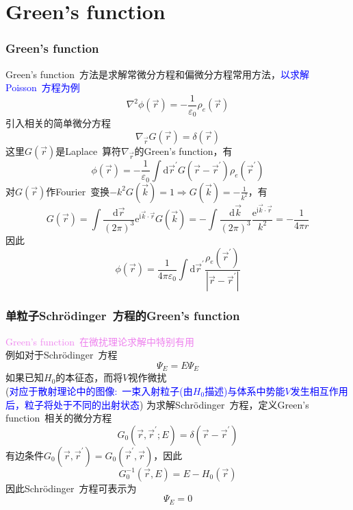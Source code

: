 \documentclass[cjk,slidestop,compress,mathserif,blue]{beamer}
\begin{document}
\section{\rm{Green's function}}
\frame
{
	\frametitle{\textrm{Green's function}}
	\textrm{Green's function~}方法是求解常微分方程和偏微分方程常用方法，\textcolor{blue}{以求解\textrm{Poisson~}方程为例}
		\vskip -10pt		
		\begin{displaymath}
			\nabla^2\phi(\vec r)=-\frac1{\varepsilon_0}\rho_e(\vec r)
		\end{displaymath}
		引入相关的简单微分方程
		\vskip -10pt		
		\begin{displaymath}
			\nabla_{\vec r}G(\vec r)=\delta(\vec r)
		\end{displaymath}
		这里$G(\vec r)$是\textrm{Laplace~}算符$\nabla_{\vec r}$的\textrm{Green's function}，有
		\vskip -8pt		
		\begin{displaymath}
			\phi(\vec r)=-\frac1{\varepsilon_0}\int\mathrm{d}\vec r^{\prime}G(\vec r-\vec r^{\prime})\rho_e(\vec r^{\prime})
		\end{displaymath}
		对$G(\vec r)$作\textrm{Fourier~}变换$-k^2G(\vec k)=1\Rightarrow G(\vec k)=-\frac1{k^2}$，有
		\vskip -5pt		
		\begin{displaymath}
				G(\vec r)=\int\frac{\mathrm{d}\vec r}{(2\pi)^3}\mathrm{e}^{\mathrm{i}\vec k\cdot\vec r}G(\vec k)=-\int\frac{\mathrm{d}\vec k}{(2\pi)^3}\frac{\mathrm{e}^{\mathrm{i}\vec k\cdot\vec r}}{k^2}=-\frac1{4\pi r}
		\end{displaymath}
		因此
		\vskip -5pt		
		\begin{displaymath}
			\phi(\vec r)=\frac1{4\pi\varepsilon_0}\int\mathrm{d}\vec r^{\prime}\frac{\rho_e(\vec r^{\prime})}{|\vec r-\vec r^{\prime}|}
		\end{displaymath}
}

\frame
{
	\frametitle{单粒子\textrm{Schr\"odinger~}方程的\textrm{Green's function}}
	\textcolor{violet}{\textrm{Green's function~}在微扰理论求解中特别有用}\\例如对于\textrm{Schr\"odinger~}方程
	\begin{displaymath}
		[H_0(\vec r)+V(\vec r)]\Psi_E=E\Psi_E
	\end{displaymath}
	如果已知$H_0$的本征态，而将$V$视作微扰\\
	(\textcolor{blue}{对应于散射理论中的图像:~一束入射粒子(由$H_0$描述)与体系中势能$V$发生相互作用后，粒子将处于不同的出射状态})
	\vskip 10pt
	为求解\textrm{Schr\"odinger~}方程，定义\textrm{Green's function~}相关的微分方程
	\begin{displaymath}
		[E-H_0(\vec r)]G_0(\vec r,\vec r^{\prime};E)=\delta(\vec r-\vec r^{\prime})
	\end{displaymath}
	有边条件$G_0(\vec r,\vec r^{\prime})=G_0(\vec r^{\prime},\vec r)$，因此
	\begin{displaymath}
		G_0^{-1}(\vec r,E)=E-H_0(\vec r)
	\end{displaymath}
	因此\textrm{Schr\"odinger~}方程可表示为
	\begin{displaymath}
		[G_0^{-1}(\vec r,E)-V(\vec r)]\Psi_E=0
	\end{displaymath}
}
\end{document}
